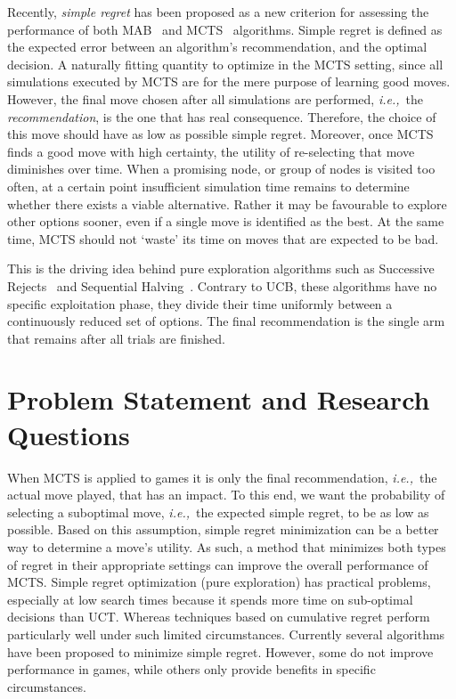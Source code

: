 \documentclass{kecsmstr}
\newcommand{\ie}{{\it i.e.,}~}
\begin{document}
Recently, \emph{simple regret} has been proposed as a new criterion for assessing the performance of both MAB~ and MCTS~ algorithms. Simple regret is defined as the expected error between an algorithm's recommendation, and the optimal decision. A naturally fitting quantity to optimize in the MCTS setting, since all simulations executed by MCTS are for the mere purpose of learning good moves. However, the final move chosen after all simulations are performed, \ie the \emph{recommendation}, is the one that has real consequence. Therefore, the choice of this move should have as low as possible simple regret. Moreover, once MCTS finds a good move with high certainty, the utility of re-selecting that move diminishes over time. When a promising node, or group of nodes is visited too often, at a certain point insufficient simulation time remains to determine whether there exists a viable alternative. Rather it may be favourable to explore other options sooner, even if a single move is identified as the best. At the same time, MCTS should not `waste' its time on moves that are expected to be bad.

This is the driving idea behind pure exploration algorithms such as Successive Rejects~ and Sequential Halving~. Contrary to UCB, these algorithms have no specific exploitation phase, they divide their time uniformly between a continuously reduced set of options. The final recommendation is the single arm that remains after all trials are finished.
\newpage
\section{Problem Statement and Research Questions}
When MCTS is applied to games it is only the final recommendation, \ie the actual move played, that has an impact. To this end, we want the probability of selecting a suboptimal move, \ie the expected simple regret, to be as low as possible. Based on this assumption, simple regret minimization can be a better way to determine a move's utility. As such, a method that minimizes both types of regret in their appropriate settings can improve the overall performance of MCTS. Simple regret optimization (pure exploration) has practical problems, especially at low search times because it spends more time on sub-optimal decisions than UCT. Whereas techniques based on cumulative regret perform particularly well under such limited circumstances. Currently several algorithms have been proposed to minimize simple regret. However, some do not improve performance in games, while others only provide benefits in specific circumstances.
\end{document}
